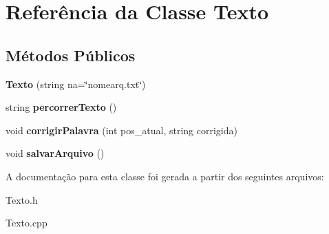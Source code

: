\hypertarget{classTexto}{}\section{Referência da Classe Texto}
\label{classTexto}
\subsection*{Métodos Públicos}
\begin{DoxyCompactItemize}
\item 
{\bfseries Texto} (string na=\char`\"{}nomearq.\+txt\char`\"{})\hypertarget{classTexto_a5ed964db73ab42ba25243836e87ab78b}{}\label{classTexto_a5ed964db73ab42ba25243836e87ab78b}

\item 
string {\bfseries percorrer\+Texto} ()\hypertarget{classTexto_a6152fb08d561060760766c3083f6489c}{}\label{classTexto_a6152fb08d561060760766c3083f6489c}

\item 
void {\bfseries corrigir\+Palavra} (int pos\+\_\+atual, string corrigida)\hypertarget{classTexto_aa01fd01702eb3106f977c1c22ff757d2}{}\label{classTexto_aa01fd01702eb3106f977c1c22ff757d2}

\item 
void {\bfseries salvar\+Arquivo} ()\hypertarget{classTexto_aa637986e50d826319f321167dfaf2d9c}{}\label{classTexto_aa637986e50d826319f321167dfaf2d9c}

\end{DoxyCompactItemize}


A documentação para esta classe foi gerada a partir dos seguintes arquivos\+:\begin{DoxyCompactItemize}
\item 
Texto.\+h\item 
Texto.\+cpp\end{DoxyCompactItemize}
